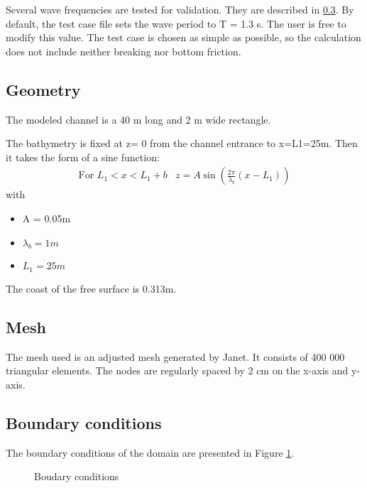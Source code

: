 Several wave frequencies are tested for validation. They are described in
\ref{rides_bc}. By default, the test case file sets the wave period to
T = 1.3 s. The user is free to modify this value. The test case is chosen as
simple as possible, so the calculation does not include
neither breaking nor bottom friction.

\subsection{Geometry}
\label{rides_geom}
The modeled channel is a 40 m long and 2 m wide rectangle.

The bathymetry is fixed at z= 0 from the channel entrance to x=L1=25m.
Then it takes the form of a sine function:
$$
\begin{array}{lr}
  \mbox {For } L_1<x<L_1+b & z = A \sin (\frac{2\pi}{\lambda_b}(x-L_1))
  \end{array}
$$
with
\begin{itemize}
\item A = 0.05m
\item $\lambda_b = 1m$
\item $L_1=25m$
\end{itemize}

The coast of the free surface is 0.313m.


\subsection{Mesh}

The mesh used is an adjusted mesh generated by Janet. It consists of 400 000
triangular elements. The nodes are regularly spaced by 2 cm on the x-axis and
y-axis.

\subsection{Boundary conditions}
\label{rides_bc}
The boundary conditions of the domain are presented in Figure \ref{fig:rides_bc}.

\begin{figure}[h]
\begin{center}
\end{center}
\caption{Boudary conditions}
\label{fig:rides_bc}
\end{figure}

